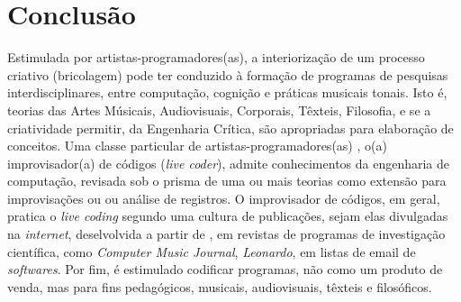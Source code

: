 \chapter*[Conclusão]{Conclusão}\label{conclusao}


Estimulada por artistas-programadores(as), a interiorização de um processo criativo (bricolagem) pode ter conduzido à formação de programas de pesquisas interdisciplinares, entre computação, cognição e práticas musicais tonais. Isto é, teorias das Artes Músicais, Audiovisuais, Corporais, Têxteis, Filosofia, e se a criatividade permitir, da Engenharia Crítica, são apropriadas para elaboração de conceitos. Uma classe particular de artistas-programadores(as) \cite[p.~16]{McLean2011}, o(a) improvisador(a) de códigos (\emph{live coder}), admite conhecimentos da engenharia de computação, revisada sob o prisma de uma ou mais teorias como extensão para improvisações ou ou análise de registros. O improvisador de códigos, em geral, pratica o \emph{live coding} segundo uma cultura de publicações, sejam elas divulgadas na \emph{internet}, deselvolvida a partir de \cite{ward_live_2004}, em revistas de programas de investigação científica, como  \emph{Computer Music Journal}, \emph{Leonardo}, em listas de email de \emph{softwares}. Por fim, é estimulado codificar programas, não como um produto de venda, mas para fins pedagógicos, musicais, audiovisuais, têxteis e filosóficos. 


